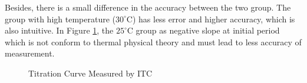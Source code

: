 \documentclass{report}
\begin{document}
Besides, there is a small difference in the accuracy between the two group.
The group with high temperature ($30^\circ$C) has less error and higher accuracy, which is also intuitive.
In Figure \ref{Titration Curve Measured by ITC}, the $25^\circ$C group as negative slope at initial period which is not conform to thermal physical theory and must lead to less accuracy of measurement.
\begin{figure}
    \centering
    \caption{Titration Curve Measured by ITC}
    \label{Titration Curve Measured by ITC}
 \end{figure}
\end{document}
